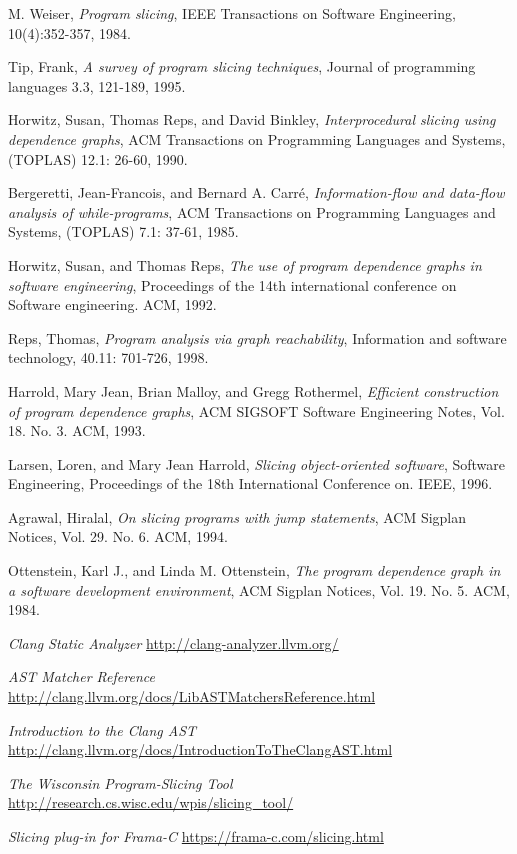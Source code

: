\documentclass[oneside,12pt,a4paper]{book}
\begin{document}
\begin{thebibliography}{Textttext}
  M. Weiser,
  \emph{Program slicing},
  IEEE Transactions on Software Engineering,
  10(4):352-357,
  1984.

  Tip, Frank,
  \emph{A survey of program slicing techniques},
  Journal of programming languages 3.3,
  121-189,
  1995. 

  Horwitz, Susan, Thomas Reps, and David Binkley,
  \emph{Interprocedural slicing using dependence graphs}, 
  ACM Transactions on Programming Languages and Systems,
  (TOPLAS) 12.1: 26-60,
  1990.

  Bergeretti, Jean-Francois, and Bernard A. Carré,
  \emph{Information-flow and data-flow analysis of while-programs},
  ACM Transactions on Programming Languages and Systems,
  (TOPLAS) 7.1: 37-61,
  1985.

  Horwitz, Susan, and Thomas Reps,
  \emph{The use of program dependence graphs in software engineering},
  Proceedings of the 14th international conference on Software engineering. 
  ACM,
  1992.

  Reps, Thomas,
  \emph{Program analysis via graph reachability},
  Information and software technology,
  40.11: 701-726,
  1998.

  Harrold, Mary Jean, Brian Malloy, and Gregg Rothermel,
  \emph{Efficient construction of program dependence graphs},
  ACM SIGSOFT Software Engineering Notes,
  Vol. 18. No. 3. ACM,
  1993.

  Larsen, Loren, and Mary Jean Harrold,
  \emph{Slicing object-oriented software},
  Software Engineering,
  Proceedings of the 18th International Conference on. IEEE,
  1996.

  Agrawal, Hiralal,
  \emph{On slicing programs with jump statements},
  ACM Sigplan Notices,
  Vol. 29. No. 6. ACM,
  1994.

  Ottenstein, Karl J., and Linda M. Ottenstein,
  \emph{The program dependence graph in a software development environment},
  ACM Sigplan Notices,
  Vol. 19. No. 5. ACM,
  1984.
  
  \emph{Clang Static Analyzer}
  \url{http://clang-analyzer.llvm.org/}

  \emph{AST Matcher Reference}
  \url{http://clang.llvm.org/docs/LibASTMatchersReference.html}
  
  \emph{Introduction to the Clang AST}
  \url{http://clang.llvm.org/docs/IntroductionToTheClangAST.html}
  
  \emph{The Wisconsin Program-Slicing Tool}
  \url{http://research.cs.wisc.edu/wpis/slicing_tool/}

  \emph{Slicing plug-in for Frama-C}
  \url{https://frama-c.com/slicing.html}

\end{thebibliography}
\end{document}
